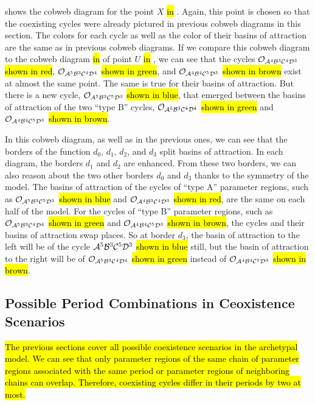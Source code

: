  shows the cobweb diagram for the point $X$ \hl{in} .
Again, this point is chosen so that the coexisting cycles were already pictured in previous cobweb diagrams in this section.
The colors for each cycle as well as the color of their basins of attraction are the same as in previous cobweb diagrams.
If we compare this cobweb diagram to the cobweb diagram \hl{in}  of point $U$ \hl{in} , we can see that the cycles $\mathcal{O}_{\mathcal{A}^4\mathcal{B}^3\mathcal{C}^4\mathcal{D}^3}$ \hl{shown in red}, $\mathcal{O}_{\mathcal{A}^5\mathcal{B}^3\mathcal{C}^4\mathcal{D}^4}$ \hl{shown in green}, and $\mathcal{O}_{\mathcal{A}^4\mathcal{B}^4\mathcal{C}^5\mathcal{D}^3}$ \hl{shown in brown} exist at almost the same point.
The same is true for their basins of attraction.
But there is a new cycle, $\mathcal{O}_{A^5\mathcal{B}^3\mathcal{C}^5\mathcal{D}^3}$ \hl{shown in blue}, that emerged between the basins of attraction of the two ``type B'' cycles, $\mathcal{O}_{\mathcal{A}^5\mathcal{B}^3\mathcal{C}^4\mathcal{D}^4}$ \hl{shown in green} and $\mathcal{O}_{\mathcal{A}^4\mathcal{B}^4\mathcal{C}^5\mathcal{D}^3}$ \hl{shown in brown}.

In this cobweb diagram, as well as in the previous ones, we can see that the borders of the function $d_0$, $d_1$, $d_2$, and $d_3$ split basins of attraction.
In each diagram, the borders $d_1$ and $d_2$ are enhanced.
From these two borders, we can also reason about the two other borders $d_0$ and $d_3$ thanks to the symmetry of the model.
The basins of attraction of the cycles of ``type A'' parameter regions, such as $\mathcal{O}_{\mathcal{A}^5\mathcal{B}^3\mathcal{C}^5\mathcal{D}^3}$ \hl{shown in blue} and $\mathcal{O}_{\mathcal{A}^4\mathcal{B}^3\mathcal{C}^4\mathcal{D}^3}$ \hl{shown in red}, are the same on each half of the model.
For the cycles of ``type B'' parameter regions, such as $\mathcal{O}_{\mathcal{A}^5\mathcal{B}^3\mathcal{C}^4\mathcal{D}^4}$ \hl{shown in green} and $\mathcal{O}_{\mathcal{A}^4\mathcal{B}^4\mathcal{C}^5\mathcal{D}^3}$ \hl{shown in brown}, the cycles and their basins of attraction swap places.
So at border $d_3$, the basin of attraction to the left will be of the cycle $\mathcal{A}^5\mathcal{B}^3\mathcal{C}^5\mathcal{D}^3$ \hl{shown in blue} still, but the basin of attraction to the right will be of $\mathcal{O}_{\mathcal{A}^5\mathcal{B}^3\mathcal{C}^4\mathcal{D}^4}$ \hl{shown in green} instead of $\mathcal{O}_{\mathcal{A}^4\mathcal{B}^4\mathcal{C}^5\mathcal{D}^3}$ \hl{shown in brown}.

\subsection{Possible Period Combinations in Ceoxistence Scenarios}

\hl{
	The previous sections cover all possible coexistence scenarios in the archetypal model.
	We can see that only parameter regions of the same chain of parameter regions associated with the same period or parameter regions of neighboring chains can overlap.
	Therefore, coexisting cycles differ in their periods by two at most.
}

